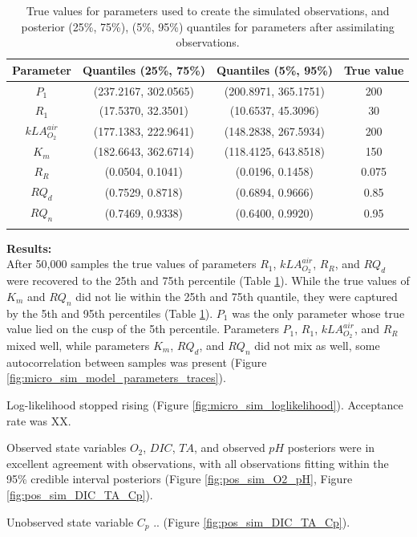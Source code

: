 \documentclass{ruthesis}
\begin{document}
\begin{longtable}{|c|c|c|c|} 
		\hline
		\bfseries{Parameter}  & \bfseries{Quantiles (25\%, 75\%)}  & \bfseries{Quantiles (5\%, 95\%)} &  \bfseries{True value} \\ \hline
		$P_1$ 				& (237.2167, 302.0565) 	& (200.8971, 365.1751) 	&  200  \\ 
		$R_1$ 				& (17.5370, 32.3501) 	& (10.6537, 45.3096)	& 	30 \\ 
		$kLA_{O_2}^{air}$ 	& (177.1383, 222.9641)  & (148.2838, 267.5934)  &  200 \\
		$K_m$ 				& (182.6643, 362.6714) 	& (118.4125, 643.8518) 	&  150 \\ 
		$R_R$ 				& (0.0504, 0.1041) 		& (0.0196, 0.1458) 		& 0.075 \\
		$RQ_d$ 				& (0.7529, 0.8718) 		& (0.6894, 0.9666) 		& 0.85 \\	
		$RQ_n$ 				& (0.7469, 0.9338) 		& (0.6400, 0.9920) 		& 0.95 \\	
		\hline
		\caption[.]{True values for parameters used to create the simulated observations, and posterior (25\%, 75\%), (5\%, 95\%) quantiles for parameters after assimilating observations.}	
		\label{table:micro_parameters_sim}
\end{longtable}

\textbf{Results:}\\
After 50,000 samples the true values of parameters $R_1$, $kLA_{O_2}^{air}$, $R_R$, and $RQ_d$ were recovered to the 25th and 75th percentile (Table \ref{table:micro_parameters_sim}). While the true values of $K_m$ and $RQ_n$ did not lie within the 25th and 75th quantile, they were captured by the 5th and 95th percentiles (Table \ref{table:micro_parameters_sim}). $P_1$ was the only parameter whose true value lied on the cusp of the 5th percentile. Parameters $P_1$, $R_1$, $kLA_{O_2}^{air}$, and $R_R$ mixed well, while parameters $K_m$, $RQ_d$, and $RQ_n$ did not mix as well, some autocorrelation between samples was present (Figure \ref{fig:micro_sim_model_parameters_traces}).


Log-likelihood stopped rising (Figure \ref{fig:micro_sim_loglikelihood}).
Acceptance rate was XX.


Observed state variables $O_2$, $DIC$, $TA$, and observed $pH$ posteriors were in excellent agreement with observations, with all observations fitting within the 95\% credible interval posteriors (Figure \ref{fig:pos_sim_O2_pH}, Figure \ref{fig:pos_sim_DIC_TA_Cp}).

Unobserved state variable $C_p$ .. (Figure \ref{fig:pos_sim_DIC_TA_Cp}).
\end{document}
